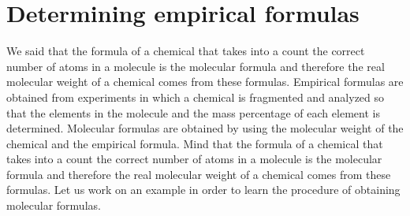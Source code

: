 \documentclass[main.tex]{subfiles}
\begin{document}
\section{Determining empirical formulas}
We said that the formula of a chemical that takes into a count the correct number of atoms in a molecule is the molecular formula and therefore the real molecular weight of a chemical comes from these formulas. Empirical formulas are obtained from experiments in which a chemical is fragmented and analyzed so that the elements in the molecule and the mass percentage of each element is determined. Molecular formulas are obtained by using the molecular weight of the chemical and the empirical formula. Mind that the formula of a chemical that takes into a count the correct number of atoms in a molecule is the molecular formula and therefore the real molecular weight of a chemical comes from these formulas. Let us work on an example in order to learn the procedure of obtaining molecular formulas. 
\sloppy
\end{document}
